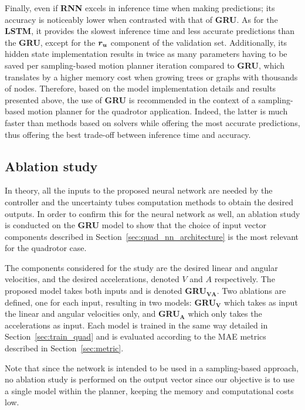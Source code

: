 Finally, even if \textbf{RNN} excels in inference time when making predictions; its accuracy is noticeably lower when contrasted with that of \textbf{GRU}.
As for the \textbf{LSTM}, it provides the slowest inference time and less accurate predictions than the \textbf{GRU}, except for the $\boldsymbol{r_u}$ component of the validation set.
Additionally, its hidden state implementation results in twice as many parameters having to be saved per sampling-based motion planner iteration compared to \textbf{GRU}, which translates by a higher memory cost when growing trees or graphs with thousands of nodes.
Therefore, based on the model implementation details and results presented above, the use of \textbf{GRU} is recommended in the context of a sampling-based motion planner for the quadrotor application.
Indeed, the latter is much faster than methods based on  solvers while offering the most accurate predictions, thus offering the best trade-off between inference time and accuracy.

\subsection{Ablation study}



In theory, all the inputs to the proposed neural network are needed by the controller and the uncertainty tubes computation methods to obtain the desired outputs. 
In order to confirm this for the neural network as well, an ablation study is conducted on the \textbf{GRU} model to show that the choice of input vector components described in Section~\ref{sec:quad_nn_architecture} is the most relevant for the quadrotor case. 

The components considered for the study are the desired linear and angular velocities, and the desired accelerations, denoted $V$ and $A$ respectively. 
The proposed model takes both inputs and is denoted \textbf{GRU$\boldsymbol{_{VA}}$}. 
Two ablations are defined, one for each input, resulting in two models: \textbf{GRU$\boldsymbol{_V}$} which takes as input the linear and angular velocities only, and \textbf{GRU$\boldsymbol{_A}$} which only takes the accelerations as input. 
Each model is trained in the same way detailed in Section~\ref{sec:train_quad} and is evaluated according to the MAE metrics described in Section~\ref{sec:metric}.

Note that since the network is intended to be used in a sampling-based approach, no ablation study is performed on the output vector since our objective is to use a single model within the planner, keeping the memory and computational costs low.

